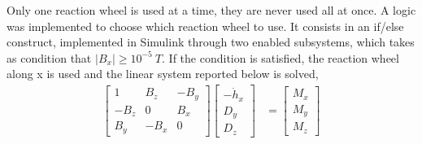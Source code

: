 Only one reaction wheel is used at a time, they are never used all at once. A logic was implemented to choose which reaction wheel to use. It consists in an if/else construct, implemented in Simulink through two enabled subsystems, which takes as condition that $|B_x|\geq 10^{-5} \ T$.
If the condition is satisfied, the reaction wheel along x is used and the linear system reported below is solved, 
\begin{equation}
\label{eq:syst1}
\begin{aligned} 
    \begin{bmatrix}
        1 & B_z & -B_y \\
        -B_z & 0 & B_x \\
        B_y & -B_x & 0 
    \end{bmatrix}\begin{bmatrix}
        -\Dot{h}_x \\
        D_y \\
        D_z
    \end{bmatrix} &=\begin{bmatrix}
        M_x \\
        M_y \\
        M_z
    \end{bmatrix}
\end{aligned}
\end{equation}

